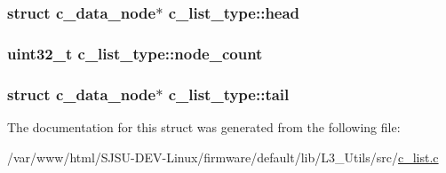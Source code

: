 \subsubsection[{\texorpdfstring{head}{head}}]{\setlength{\rightskip}{0pt plus 5cm}struct {\bf c\+\_\+data\+\_\+node}$\ast$ c\+\_\+list\+\_\+type\+::head}\hypertarget{structc__list__type_ab42be6da380f1295613db5f97036b528}{}\label{structc__list__type_ab42be6da380f1295613db5f97036b528}
\subsubsection[{\texorpdfstring{node\+\_\+count}{node_count}}]{\setlength{\rightskip}{0pt plus 5cm}uint32\+\_\+t c\+\_\+list\+\_\+type\+::node\+\_\+count}\hypertarget{structc__list__type_a1b43f68c2d70340e5d0f56972b870a36}{}\label{structc__list__type_a1b43f68c2d70340e5d0f56972b870a36}
\subsubsection[{\texorpdfstring{tail}{tail}}]{\setlength{\rightskip}{0pt plus 5cm}struct {\bf c\+\_\+data\+\_\+node}$\ast$ c\+\_\+list\+\_\+type\+::tail}\hypertarget{structc__list__type_a30f8e4d675eb4471d1f2829dbea5ccea}{}\label{structc__list__type_a30f8e4d675eb4471d1f2829dbea5ccea}


The documentation for this struct was generated from the following file\+:\begin{DoxyCompactItemize}
\item 
/var/www/html/\+S\+J\+S\+U-\/\+D\+E\+V-\/\+Linux/firmware/default/lib/\+L3\+\_\+\+Utils/src/\hyperlink{c__list_8c}{c\+\_\+list.\+c}\end{DoxyCompactItemize}
